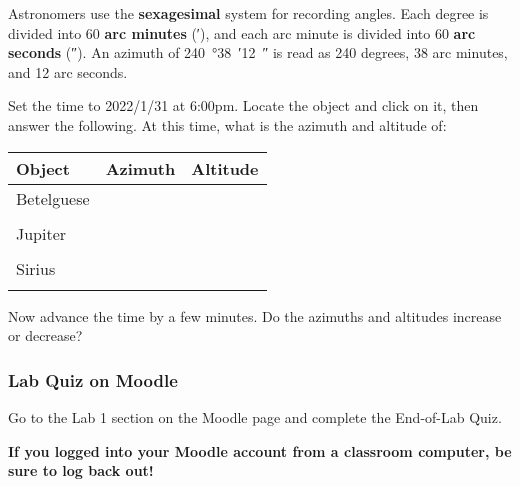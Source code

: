 \documentclass[main.tex]{subfiles}
\begin{document}
Astronomers use the \textbf{sexagesimal} system for recording angles. Each degree is divided into 60 \textbf{arc minutes} (\si{\arcminute}), and each arc minute is divided into 60 \textbf{arc seconds} (\si{\arcsecond}). An azimuth of \SI{240}{\degree}\SI{38}{\arcminute}\SI{12}{\arcsecond} is read as 240 degrees, 38 arc minutes, and 12 arc seconds.

Set the time to 2022/1/31 at 6:00pm. Locate the object and click on it, then answer the following. At this time, what is the azimuth and altitude of: 
\begin{center}
\begin{tabular}{|l|p{5cm}|p{5cm}|}\hline
Object & Azimuth & Altitude \\\hline
Betelguese & & \\
&&\\\hline
Jupiter & & \\
&&\\\hline
Sirius & & \\
&&\\\hline
\end{tabular}
\end{center}
   
Now advance the time by a few minutes. Do the azimuths and altitudes increase or decrease?

\subsubsection{Lab Quiz on Moodle}
Go to the Lab 1 section on the Moodle page and complete the End-of-Lab Quiz.

\textbf{If you logged into your Moodle account from a classroom computer, be sure to log back out!}
\end{document}
